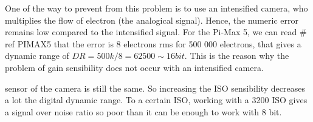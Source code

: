 One of the way to prevent from this problem is to use an intensified camera, who multiplies the flow of electron (the analogical signal). Hence, the numeric error remains low compared to the intensified signal. For the Pi-Max 5, we can read \# ref PIMAX5 that the error is 8 electrons rms for 500 000 electrons, that gives a dynamic range of $DR=500k/8 = 62 500\sim 16 bit$. This is the reason why the problem of gain sensibility does not occur with an intensified camera.

sensor of the camera is still the same. So increasing the ISO sensibility decreases a lot the digital dynamic range. To a certain ISO, working with a 3200 ISO gives a signal over noise ratio so poor than it can be enough to work with 8 bit. 
